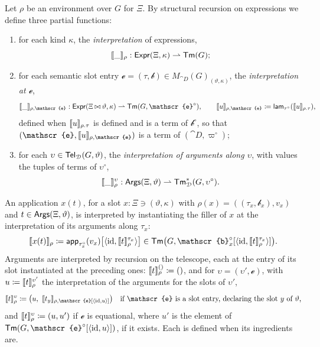 \begin{definition}\label{def:interpretation}
    Let $\rho$ be an environment over $G$ for $\Xi$. By structural recursion on expressions we define three partial functions:
    \begin{enumerate}
        \item for each kind $\kappa$, the \emph{interpretation} of expressions,
        \[
            \llbracket\_\rrbracket_\rho : \mathsf{Expr}(\Xi, \kappa) \rightharpoonup \mathsf{Tm}(G);
        \]
        \item for each semantic slot entry $\mathscr{e} = (\tau, \mathscr{b}) \in M_{\cat{D}}(G)_{(\vartheta, \kappa)}$, the \emph{interpretation at $\mathscr{e}$},
        \[
            \sem{\_}_{\rho, \mathscr{e}} : \Expr(\Xi \concat \vartheta, \kappa) \rightharpoonup \Tm(G, \mathscr{e}^{\circ}), \qquad \sem{u}_{\rho, \mathscr{e}} \coloneqq \lam_{\tau^{\circ}}(\sem{u}_{\rho.\tau}),
        \]
        defined when $\llbracket u\rrbracket_{\rho.\tau}$ is defined and is a term of $\mathscr{b}^{\circ}$, so that $(\mathscr{e}, \sem{u}_{\rho, \mathscr{e}})$ is a term of $(\cat{D}, \varpi^{\circ})$;
        \item for each $\upsilon \in \mathsf{Tel}_{\mathcal{D}}(G, \vartheta)$, the \emph{interpretation of arguments along $\upsilon$}, with values the tuples of terms of $\upsilon^{\circ}$,
        \[
            \llbracket\_\rrbracket^{\upsilon}_\rho : \mathsf{Args}(\Xi, \vartheta) \rightharpoonup \mathsf{Tm}^*_{\mathcal{D}}(G, \upsilon^{\circ}).
        \]
    \end{enumerate}
    An application $x(t)$, for a slot $x : \Xi \ni (\vartheta, \kappa)$ with $\rho(x) = ((\tau_x, \mathscr{b}_x), v_x)$ and $t \in \mathsf{Args}(\Xi, \vartheta)$, is interpreted by instantiating the filler of $x$ at the interpretation of its arguments along $\tau_x$:
    \[
        \sem{x(t)}_\rho \coloneqq \app_{\tau_x^{\circ}}(v_x)\big[\langle \id, \sem{t}^{\tau_x}_\rho \rangle\big] \in \Tm\big(G, \mathscr{b}_x^{\circ}[\langle \id, \sem{t}^{\tau_x}_\rho \rangle]\big).
    \]
    Arguments are interpreted by recursion on the telescope, each at the entry of its slot instantiated at the preceding ones: $\llbracket t\rrbracket^{()}_\rho \coloneqq ()$, and for $\upsilon = (\upsilon', \mathscr{e})$, with $u \coloneqq \llbracket t\rrbracket^{\upsilon'}_\rho$ the interpretation of the arguments for the slots of $\upsilon'$,
    \[
        \sem{t}^{\upsilon}_\rho \coloneqq \big(u,\ \sem{t_y}_{\rho, \mathscr{e}[\langle \id, u \rangle]}\big) \quad \text{if $\mathscr{e}$ is a slot entry, declaring the slot $y$ of $\vartheta$,}
    \]
    and $\llbracket t\rrbracket^{\upsilon}_\rho \coloneqq (u, u')$ if $\mathscr{e}$ is equational, where $u'$ is the element of $\Tm(G, \mathscr{e}^{\circ}[\langle \id, u \rangle])$, if it exists. Each is defined when its ingredients are.
\end{definition}

